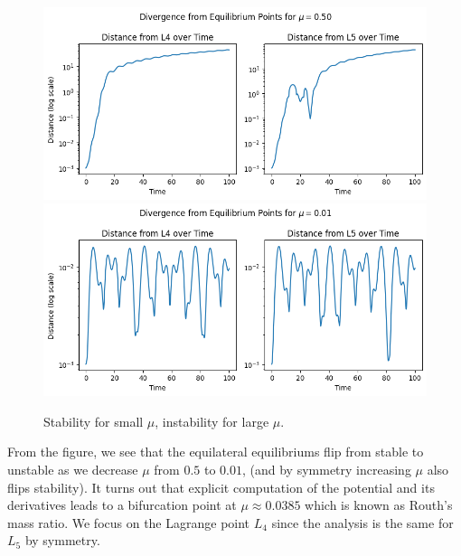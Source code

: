 \documentclass{article}
\begin{document}
\begin{figure}
    \centering
    \includegraphics[width = 1\linewidth]{images/distance_0.5.png}
    \includegraphics[width = 1\linewidth]{images/distance_0.01.png}
    \caption{Stability for small \(\mu\), instability for large \(\mu\).}
\end{figure}

From the figure, we see that the equilateral equilibriums flip from stable to unstable as we decrease \(\mu\) from \(0.5\) to \(0.01\), (and by symmetry increasing \(\mu\) also flips stability). It turns out that explicit computation of the potential and its derivatives leads to a bifurcation point at \(\mu \approx 0.0385\) which is known as Routh's mass ratio. We focus on the Lagrange point \(L_4\) since the analysis is the same for \(L_5\) by symmetry.
\end{document}
